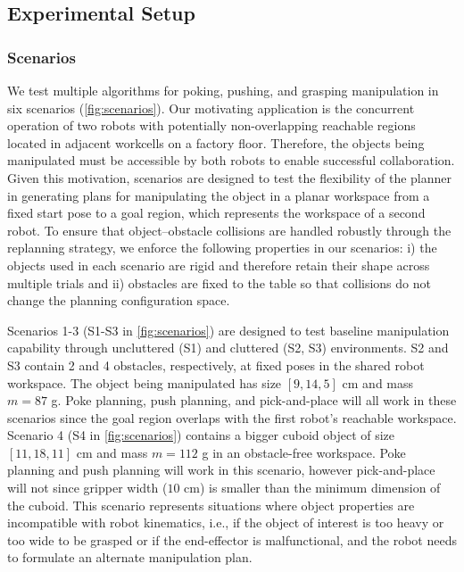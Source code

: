 \subsection{Experimental Setup}



\subsubsection{Scenarios}\label{sec:evaluation-scenarios}

We test multiple algorithms for poking, pushing, and grasping manipulation in six scenarios (\cref{fig:scenarios}).
Our motivating application is the concurrent operation of two robots with potentially non-overlapping reachable regions located in adjacent workcells on a factory floor. Therefore, the objects being manipulated must be accessible by both robots to enable successful collaboration.
Given this motivation, scenarios are designed to test the flexibility of the planner in generating plans for manipulating the object in a planar workspace from a fixed start pose to a goal region, which represents the workspace of a second robot. To ensure that object--obstacle collisions are handled robustly through the replanning strategy, we enforce the following properties in our scenarios: i) the objects used in each scenario are rigid and therefore retain their shape across multiple trials and ii) obstacles are fixed to the table so that collisions do not change the planning configuration space.

Scenarios 1-3 (S1-S3 in \cref{fig:scenarios}) are designed to test baseline manipulation capability through uncluttered (S1) and cluttered (S2, S3) environments. S2 and S3 contain 2 and 4 obstacles, respectively, at fixed poses in the shared robot workspace. The object being manipulated has size $[9, 14, 5]$ cm and mass $m=87$ g. Poke planning, push planning, and pick-and-place will all work in these scenarios since the goal region overlaps with the first robot's reachable workspace.
Scenario 4 (S4 in \cref{fig:scenarios}) contains a bigger cuboid object of size $[11, 18, 11]$ cm and mass $m=112$ g in an obstacle-free workspace. Poke planning and push planning will work in this scenario, however pick-and-place will not since gripper width ($10$ cm) is smaller than the minimum dimension of the cuboid. This scenario represents situations where object properties are incompatible with robot kinematics, i.e., if the object of interest is too heavy or too wide to be grasped or if the end-effector is malfunctional, and the robot needs to formulate an alternate manipulation plan.

